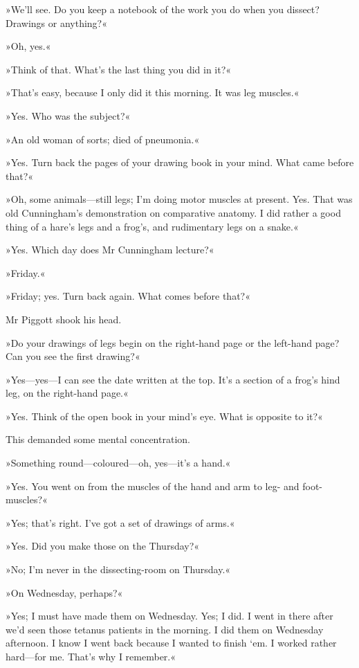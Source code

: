 »We'll see. Do you keep a notebook of the work you do when you dissect? Drawings or anything?«

»Oh, yes.«

»Think of that. What's the last thing you did in it?«

»That's easy, because I only did it this morning. It was leg muscles.«

»Yes. Who was the subject?«

»An old woman of sorts; died of pneumonia.«

»Yes. Turn back the pages of your drawing book in your mind. What came before that?«

»Oh, some animals—still legs; I'm doing motor muscles at present. Yes. That was old Cunningham's demonstration on comparative anatomy. I did rather a good thing of a hare's legs and a frog's, and rudimentary legs on a snake.«

»Yes. Which day does Mr Cunningham lecture?«

»Friday.«

»Friday; yes. Turn back again. What comes before that?«

Mr Piggott shook his head.

»Do your drawings of legs begin on the right-hand page or the left-hand page? Can you see the first drawing?«

»Yes—yes—I can see the date written at the top. It's a section of a frog's hind leg, on the right-hand page.«

»Yes. Think of the open book in your mind's eye. What is opposite to it?«

This demanded some mental concentration.

»Something round—coloured—oh, yes—it's a hand.«

»Yes. You went on from the muscles of the hand and arm to leg- and foot-muscles?«

»Yes; that's right. I've got a set of drawings of arms.«

»Yes. Did you make those on the Thursday?«

»No; I'm never in the dissecting-room on Thursday.«

»On Wednesday, perhaps?«

»Yes; I must have made them on Wednesday. Yes; I did. I went in there after we'd seen those tetanus patients in the morning. I did them on Wednesday afternoon. I know I went back because I wanted to finish `em. I worked rather hard—for me. That's why I remember.«

